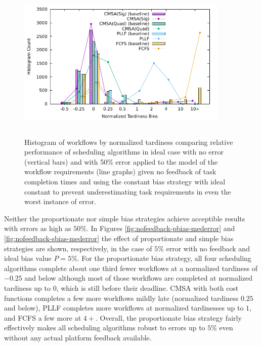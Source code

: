 \documentclass[10pt]{csce}
\begin{document}
\begin{figure}
	\begin{center}
		\includegraphics[width=0.9\textwidth,height=3in]{figures/Histogram_All_CompleteHighAllUniformError_WithCBias.pdf}
	\end{center}
	\caption{Histogram of workflows by normalized tardiness comparing
		relative performance of scheduling algorithms in ideal case with no
		error (vertical bars) and with 50\% error applied to the model of the
		workflow requirements (line graphs) given no feedback of task
		completion times and using the constant bias strategy with ideal
		constant to prevent underestimating task requirements in even the
		worst instance of error.}
	\label{fig:nofeedback-cbias-higherror}
\end{figure}

Neither the proportionate nor simple bias strategies achieve acceptible
results with errors as high as $50\%$.  In Figures
\ref{fig:nofeedback-pbias-mederror} and \ref{fig:nofeedback-sbias-mederror}
the effect of proportionate and simple bias strategies are shown, respectively,
in the case of $5\%$ error with no feedback and ideal bias value $P=5\%$.
For the proportionate bias strategy, all four scheduling algorithms complete
about one third fewer workflows at a normalized tardiness of $-0.25$ and below
although most of those workflows are completed at normalized tardiness up to
$0$, which is still before their deadline.  CMSA with both cost functions completes
a few more workflows mildly late (normalized tardiness $0.25$ and below), PLLF
completes more workflows at normalized tardinesses up to $1$, and FCFS a few
more at $4+$.  Overall, the proportionate bias strategy fairly effectively
makes all scheduling algorithms robust to errors up to $5\%$ even without any
actual platform feedback available.
\end{document}
